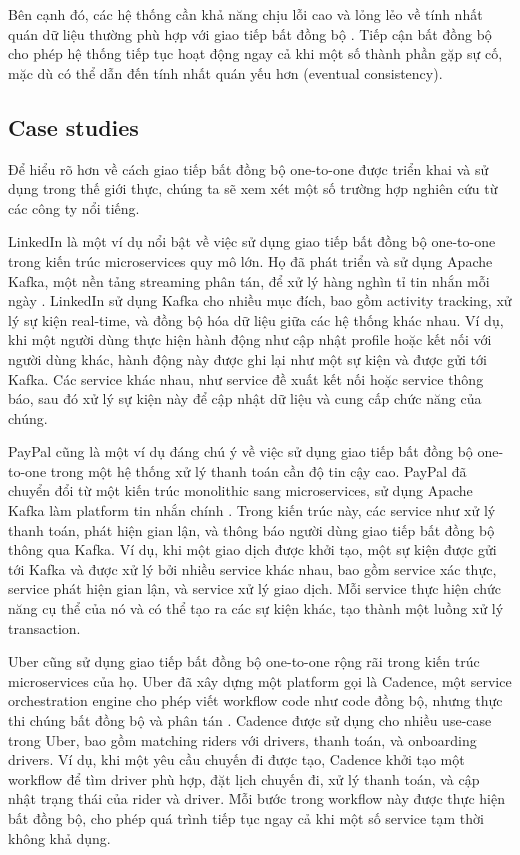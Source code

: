 Bên cạnh đó, các hệ thống cần khả năng chịu lỗi cao và lỏng lẻo về tính nhất quán dữ liệu thường phù hợp với giao tiếp bất đồng bộ \cite{fowler2002}. Tiếp cận bất đồng bộ cho phép hệ thống tiếp tục hoạt động ngay cả khi một số thành phần gặp sự cố, mặc dù có thể dẫn đến tính nhất quán yếu hơn (eventual consistency).

\subsection{Case studies}
Để hiểu rõ hơn về cách giao tiếp bất đồng bộ one-to-one được triển khai và sử dụng trong thế giới thực, chúng ta sẽ xem xét một số trường hợp nghiên cứu từ các công ty nổi tiếng.

LinkedIn là một ví dụ nổi bật về việc sử dụng giao tiếp bất đồng bộ one-to-one trong kiến trúc microservices quy mô lớn. Họ đã phát triển và sử dụng Apache Kafka, một nền tảng streaming phân tán, để xử lý hàng nghìn tỉ tin nhắn mỗi ngày \cite{goodhope2012}. LinkedIn sử dụng Kafka cho nhiều mục đích, bao gồm activity tracking, xử lý sự kiện real-time, và đồng bộ hóa dữ liệu giữa các hệ thống khác nhau. Ví dụ, khi một người dùng thực hiện hành động như cập nhật profile hoặc kết nối với người dùng khác, hành động này được ghi lại như một sự kiện và được gửi tới Kafka. Các service khác nhau, như service đề xuất kết nối hoặc service thông báo, sau đó xử lý sự kiện này để cập nhật dữ liệu và cung cấp chức năng của chúng.

PayPal cũng là một ví dụ đáng chú ý về việc sử dụng giao tiếp bất đồng bộ one-to-one trong một hệ thống xử lý thanh toán cần độ tin cậy cao. PayPal đã chuyển đổi từ một kiến trúc monolithic sang microservices, sử dụng Apache Kafka làm platform tin nhắn chính \cite{raman2016}. Trong kiến trúc này, các service như xử lý thanh toán, phát hiện gian lận, và thông báo người dùng giao tiếp bất đồng bộ thông qua Kafka. Ví dụ, khi một giao dịch được khởi tạo, một sự kiện được gửi tới Kafka và được xử lý bởi nhiều service khác nhau, bao gồm service xác thực, service phát hiện gian lận, và service xử lý giao dịch. Mỗi service thực hiện chức năng cụ thể của nó và có thể tạo ra các sự kiện khác, tạo thành một luồng xử lý transaction.

Uber cũng sử dụng giao tiếp bất đồng bộ one-to-one rộng rãi trong kiến trúc microservices của họ. Uber đã xây dựng một platform gọi là Cadence, một service orchestration engine cho phép viết workflow code như code đồng bộ, nhưng thực thi chúng bất đồng bộ và phân tán \cite{fateev2017}. Cadence được sử dụng cho nhiều use-case trong Uber, bao gồm matching riders với drivers, thanh toán, và onboarding drivers. Ví dụ, khi một yêu cầu chuyến đi được tạo, Cadence khởi tạo một workflow để tìm driver phù hợp, đặt lịch chuyến đi, xử lý thanh toán, và cập nhật trạng thái của rider và driver. Mỗi bước trong workflow này được thực hiện bất đồng bộ, cho phép quá trình tiếp tục ngay cả khi một số service tạm thời không khả dụng.

